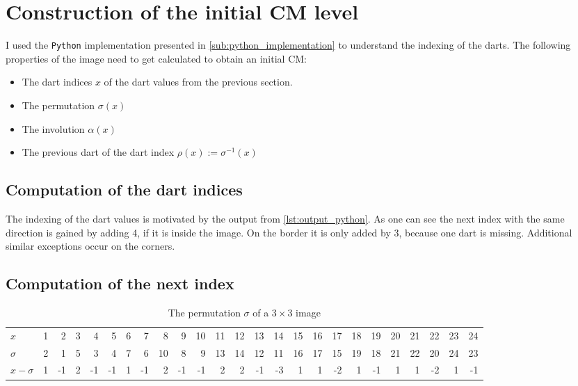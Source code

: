 \documentclass[12pt]{article}
\begin{document}

\section{Construction of the initial CM level} %
\label{sec:construction_of_the_initial_cm_level}

I used the \texttt{Python} implementation presented in \cref{sub:python_implementation} to understand the indexing of the darts.
The following properties of the image need to get calculated to obtain an initial CM\@:
\begin{itemize}
  \item The dart indices \( x \) of the dart values from the previous section.
  \item The permutation \( \sigma(x) \)
  \item The involution \( \alpha(x) \)
  \item The previous dart of the dart index \( \rho(x) := \sigma^{-1}(x)  \)
\end{itemize}

\subsection{Computation of the dart indices} %
\label{sub:computation_of_the_dart_indices}

The indexing of the dart values is motivated by the output from \cref{lst:output_python}. As one can see the next index with the same direction is gained by adding 4, if it is inside the image.
On the border it is only added by 3, because one dart is missing. Additional similar exceptions occur on the corners.


\subsection{Computation of the next index} %
\label{sub:computation_of_the_next_index}

\begin{table}[tb]
  \caption{The permutation \( \sigma \) of a \( 3 \times 3 \) image}
  \label{tab:permutation}
  \centering

  \tiny
  \begin{tabular}{lrrrrrrrrrrrrrrrrrrrrrrrr}
  \toprule
  \( x \)& 1 & 2 & 3 & 4 & 5 & 6 & 7 & 8 & 9 & 10 & 11 & 12 & 13 & 14 & 15 & 16 & 17 & 18 & 19 & 20 & 21 & 22 & 23 & 24 \\
\( \sigma \)& 2 & 1 & 5 & 3 & 4 & 7 & 6 & 10& 8 & 9 & 13& 14& 12& 11& 16& 17& 15& 19& 18& 21& 22& 20& 24& 23 \\
\( x - \sigma \)& 1 & -1 & 2 & -1 & -1 & 1 & -1 &  2 & -1 & -1 &  2 &  2 &  -1 &  -3 &  1 &  1 &  -2 &  1 &  -1 &  1 &  1 &  -2 &  1 & -1\\
  \bottomrule
  \end{tabular}
\end{table}
\end{document}
